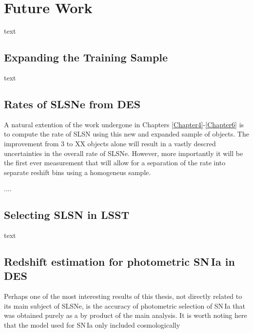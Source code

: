 \section{Future Work}
text

\subsection{Expanding the Training Sample}
text

\subsection{Rates of SLSNe from DES}
A natural extention of the work undergone in Chapters \ref{Chapter4}-\ref{Chapter6} is to compute the rate of SLSN using this new and expanded sample of objects. The improvement from 3 to XX objects alone will result in a vastly descred uncertainties in the overall rate of SLSNe. However, more importantly it will be the first ever measurement that will allow for a separation of the rate into separate reshift bins using a homogeneus sample.

....

\subsection{Selecting SLSN in LSST}
text

\subsection{Redshift estimation for photometric SN\,Ia in DES}
Perhaps one of the most interesting results of this thesis, not directly related to its main subject of SLSNe, is the accuracy of photometric selection of SN\,Ia that was obtained purely as a by product of the main analysis. It is worth noting here that the model used for SN\,Ia only included cosmologically
